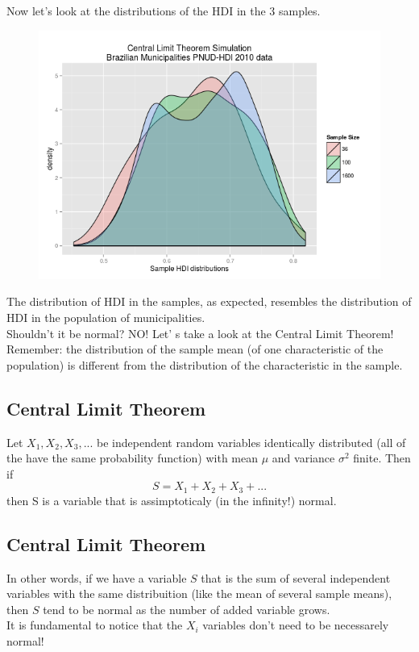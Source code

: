 \documentclass[11pt]{article}
\begin{document}
Now let's look at the distributions of the HDI in the 3 samples.
\begin{figure}[htp]
\centering
\includegraphics[scale=0.50]{clt_sample_dist.png}
\caption{}
\label{}
\end{figure}

	The distribution of HDI in the samples, as expected, resembles the distribution of HDI in the population of municipalities.
	\newline\\
	Shouldn't it be normal? NO! Let' s take a look at the Central Limit Theorem!
	\newline\\
	Remember: the distribution of the sample mean (of one characteristic of the population) is different from the distribution of the characteristic in the sample.

	\subsection*{Central Limit Theorem}
	Let $X_1,X_2,X_3,...$ be independent random variables identically distributed (all of the have the same probability function) with mean $\mu$ and variance $\sigma^2$ finite. Then if
	\[S= X_1 + X_2 + X_3 +...\]
	then S is a variable that is assimptoticaly (in the infinity!) normal.

	\subsection*{Central Limit Theorem}
	In other words, if we have a variable $S$ that is the sum of several independent variables with the same distribuition (like the mean of several sample means), then $S$ tend to be normal as the number of added variable grows.
	\newline\\
	It is fundamental to notice that the $X_i$ variables don't need to be necessarely normal!
\end{document}
